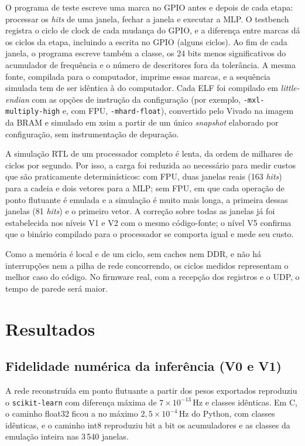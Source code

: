 \documentclass[12pt]{article}
\begin{document}
O programa de teste escreve uma marca no GPIO antes e depois de cada etapa: processar os \textit{hits} de uma janela, fechar a janela e executar a MLP. O testbench registra o ciclo de clock de cada mudança do GPIO, e a diferença entre marcas dá os ciclos da etapa, incluindo a escrita no GPIO (alguns ciclos). Ao fim de cada janela, o programa escreve também a classe, os 24 bits menos significativos do acumulador de frequência e o número de descritores fora da tolerância. A mesma fonte, compilada para o computador, imprime essas marcas, e a sequência simulada tem de ser idêntica à do computador. Cada ELF foi compilado em \textit{little-endian} com as opções de instrução da configuração (por exemplo, \texttt{-mxl-multiply-high} e, com FPU, \texttt{-mhard-float}), convertido pelo Vivado na imagem da BRAM e simulado em xsim a partir de um único \textit{snapshot} elaborado por configuração, sem instrumentação de depuração.

A simulação RTL de um processador completo é lenta, da ordem de milhares de ciclos por segundo. Por isso, a carga foi reduzida ao necessário para medir custos que são praticamente determinísticos: com FPU, duas janelas reais (163 \textit{hits}) para a cadeia e dois vetores para a MLP; sem FPU, em que cada operação de ponto flutuante é emulada e a simulação é muito mais longa, a primeira dessas janelas (81 \textit{hits}) e o primeiro vetor. A correção sobre todas as janelas já foi estabelecida nos níveis V1 e V2 com o mesmo código-fonte; o nível V5 confirma que o binário compilado para o processador se comporta igual e mede seu custo.

Como a memória é local e de um ciclo, sem caches nem DDR, e não há interrupções nem a pilha de rede concorrendo, os ciclos medidos representam o melhor caso do código. No firmware real, com a recepção dos registros e o UDP, o tempo de parede será maior.

\section{Resultados}
\label{sec:resultados}

\subsection{Fidelidade numérica da inferência (V0 e V1)}

A rede reconstruída em ponto flutuante a partir dos pesos exportados reproduziu o \texttt{scikit-learn} com diferença máxima de \(7\times10^{-13}\)\,Hz e classes idênticas. Em C, o caminho float32 ficou a no máximo \(2{,}5\times10^{-4}\)\,Hz do Python, com classes idênticas, e o caminho int8 reproduziu bit a bit os acumuladores e as classes da emulação inteira nas 3\,540 janelas.
\end{document}

